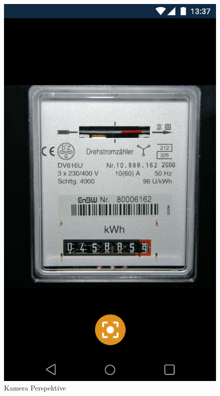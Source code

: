 \begin{figure}[h]
	\includegraphics[scale = 0.22]{img/AndroidMockup/SystemCamera}		
	\caption{Kamera Perspektive}
	\label{fig:mock-pw}
\end{figure}

